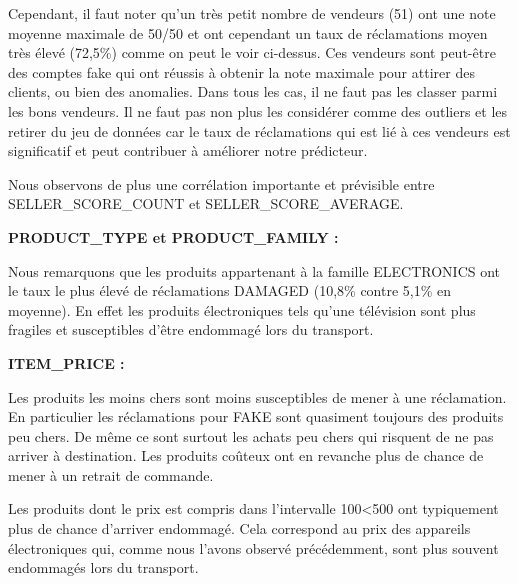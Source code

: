 Cependant, il faut noter qu'un très petit nombre de vendeurs (51) ont une note moyenne 
maximale de 50/50 et ont cependant un taux de réclamations moyen très élevé (72,5\%) comme
on peut le voir ci-dessus.
Ces vendeurs sont peut-être des comptes fake qui ont réussis à obtenir la note maximale
pour attirer des clients, ou bien des anomalies. Dans tous les cas, il ne faut pas les 
classer parmi les bons vendeurs. Il ne faut pas non plus les considérer comme des outliers
et les retirer du jeu de données car le taux de réclamations qui est lié à ces vendeurs est 
significatif et peut contribuer à améliorer notre prédicteur.

Nous observons de plus une corrélation importante et prévisible entre SELLER_SCORE_COUNT et 
SELLER_SCORE_AVERAGE.

\textbf{PRODUCT_TYPE et PRODUCT_FAMILY :}

Nous remarquons que les produits appartenant à la famille ELECTRONICS ont le taux le plus 
élevé de réclamations DAMAGED (10,8\% contre 5,1\% en moyenne). En effet les produits
électroniques tels qu'une télévision sont plus fragiles et susceptibles d'être 
endommagé lors du transport.


\textbf{ITEM_PRICE :}

Les produits les moins chers sont moins susceptibles de mener à une réclamation.
En particulier les réclamations pour FAKE sont quasiment toujours des produits peu chers.
De même ce sont surtout les achats peu chers qui risquent de ne pas arriver à destination.
Les produits coûteux ont en revanche plus de chance de mener à un retrait de commande.

Les produits dont le prix est compris dans l'intervalle 100<500 ont typiquement plus de
chance d'arriver endommagé. Cela correspond au prix des appareils électroniques qui, comme
nous l'avons observé précédemment, sont plus souvent endommagés lors du transport.



























